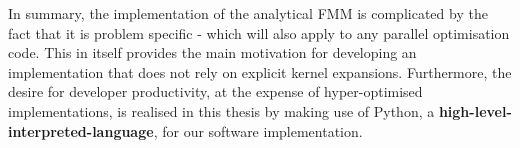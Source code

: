 In summary, the implementation of the analytical FMM is complicated by the
fact that it is problem specific - which will also apply to any parallel
optimisation code. This in itself provides the main motivation for developing
an implementation that does not rely on explicit kernel expansions. Furthermore,
the desire for developer productivity, at the expense of hyper-optimised
implementations, is realised in this thesis by making use of Python,
a \textbf{\gls{high-level-interpreted-language}}, for our software implementation.
